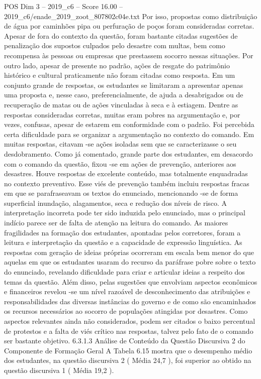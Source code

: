 \begin{textsample}{POS Dim 3 – 2019\_c6 – Score 16.00 – 2019\_c6/enade\_2019\_zoot\_807802c04e.txt}
Por isso, propostas como distribuição de água por caminhões pipa ou perfuração de poços foram consideradas corretas.
Apesar de fora do contexto da questão, foram bastante citadas sugestões de penalização dos supostos culpados pelo desastre com multas, bem como recompensa às pessoas ou empresas que prestassem socorro nessas situações.
Por outro lado, apesar de presente no padrão, ações de resgate do patrimônio histórico e cultural praticamente não foram citadas como resposta.
Em um conjunto grande de respostas, os estudantes se limitaram a apresentar apenas uma proposta e, nesse caso, preferencialmente, de ajuda a desabrigados ou de recuperação de matas ou de ações vinculadas à seca e à estiagem.
Dentre as respostas consideradas corretas, muitas eram pobres na argumentação e, por vezes, confusas, apesar de estarem em conformidade com o padrão.
Foi percebida certa dificuldade para se organizar a argumentação no contexto do comando.
Em muitas respostas, citavam -se ações isoladas sem que se caracterizasse o seu desdobramento.
Como já comentado, grande parte dos estudantes, em desacordo com o comando da questão, fixou -se em ações de prevenção, anteriores aos desastres.
Houve respostas de excelente conteúdo, mas totalmente enquadradas no contexto preventivo.
Esse viés de prevenção também incluiu respostas fracas em que se parafraseavam os textos do enunciado, mencionando -se de forma superficial inundação, alagamentos, seca e redução dos níveis de risco.
A interpretação incorreta pode ter sido induzida pelo enunciado, mas o principal indício parece ser de falta de atenção na leitura do comando.
As maiores fragilidades na formação dos estudantes, apontadas pelos corretores, foram a leitura e interpretação da questão e a capacidade de expressão linguística.
As respostas com geração de ideias próprias ocorreram em escala bem menor do que aquelas em que os estudantes usaram do recurso da paráfrase pobre sobre o texto do enunciado, revelando dificuldade para criar e articular ideias a respeito dos temas da questão.
Além disso, pelas sugestões que envolviam aspectos econômicos e financeiros revelou -se um nível razoável de desconhecimento das atribuições e responsabilidades das diversas instâncias do governo e de como são encaminhados os recursos necessários ao socorro de populações atingidas por desastres.
Como aspectos relevantes ainda não considerados, podem ser citados o baixo percentual de protestos e a falta de viés crítico nas respostas, talvez pelo fato de o comando ser bastante objetivo. 6.3.1.3 Análise de Conteúdo da Questão Discursiva 2 do Componente de Formação Geral A Tabela 6.15 mostra que o desempenho médio dos estudantes, na questão discursiva 2 ( Média 24,7 ), foi superior ao obtido na questão discursiva 1 ( Média 19,2 ).

\end{textsample}
